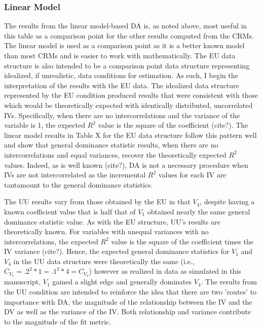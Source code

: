 \documentclass[ShortAfour,times,sageapa]{sagej}
\begin{document}
		\subsubsection{Linear Model}
	
	The results from the linear model-based DA is, as noted above, most useful in this table as a comparison point for the other results computed from the CRMs.
	The linear model is used as a comparison point as it is a better known model than most CRMs and is easier to work with mathematically.
	The EU data structure is also intended to be a comparison point data structure representing idealized, if unrealistic, data conditions for estimation.
	As such, I begin the interpretation of the results with the EU data.	
	The idealized data structure represented by the EU condition produced results that were consistent with those which would be theoretically expected with identically distributed, uncorrelated IVs.  
	Specifically, when there are no intercorrelations and the variance of the variable is 1, the expected $R^2$ value is the square of the coefficient (cite?).
	The linear model results in Table X for the EU data structure follow this pattern well and show that general dominance statistic results, when there are no intercorrelations and equal variances, recover the theoretically expected $R^2$ values.  
	Indeed, as is well known (cite?), DA is not a necessary procedure when IVs are not intercorrelated as the incremental $R^2$ values for each IV are tantamount to the general dominance statistics.
	
	
	The UU results vary from those obtained by the EU in that $V_4$, despite having a known coefficient value that is half that of $V_1$ obtained nearly the same general dominance statistic value.
	As with the EU structure, UU's results are theoretically known.
	For variables with unequal variances with no intercorrelations, the expected $R^2$ value is the square of the coefficient times the IV variance (cite?).
	Hence, the expected general dominance statistics for $V_1$ and $V_4$ in the UU data structure were theoretically the same (i.e., $C_{V_1} = .2^2*1 = .1^2*4 = C_{V_4}$) however as realized in data as simulated in this manuscript, $V_1$ gained a slight edge and generally dominates $V_4$.
	The results from the UU condition are intended to reinforce the idea that there are two 'routes' to importance with DA, the magnitude of the relationship between the IV and the DV as well as the variance of the IV.
	Both relationship and variance contribute to the magnitude of the fit metric.
	
\end{document}
